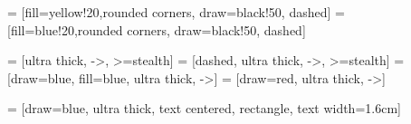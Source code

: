    = [fill=yellow!20,rounded corners, draw=black!50, dashed]
 = [fill=blue!20,rounded corners, draw=black!50, dashed]

  = [ultra thick, ->, >=stealth]             %
 = [dashed, ultra thick, ->, >=stealth]     %
 = [draw=blue, fill=blue, ultra thick, ->]  %
 = [draw=red, ultra thick, ->] %


   = [draw=blue, %
              ultra thick,       %
              text centered,
              rectangle,         %
              text width=1.6cm]  %
